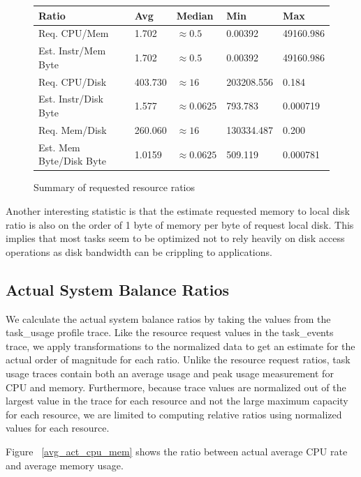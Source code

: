 \documentclass{sig-alternate}
\begin{document}
\begin{figure}
\centering
\begin{tabular}{| p{2cm} | p{1.25cm} | p{1.25cm} | p{1.25cm} | p{1.25cm } |} \hline
Ratio & Avg & Median & Min & Max \\ \hline
Req. CPU/Mem & 1.702 & $\approx 0.5$ & 0.00392 & 49160.986  \\ \hline
Est. Instr/Mem Byte & 1.702 & $\approx 0.5$ & 0.00392 & 49160.986 \\ \hline
Req. CPU/Disk & 403.730 & $\approx 16$ & 203208.556 & 0.184 \\ \hline
Est. Instr/Disk Byte & 1.577 & $\approx 0.0625$ & 793.783 & 0.000719 \\ \hline
Req. Mem/Disk & 260.060 & $\approx 16$ & 130334.487 & 0.200 \\ \hline
Est. Mem Byte/Disk Byte & 1.0159 & $\approx 0.0625$ & 509.119 & 0.000781 \\ \hline
\end{tabular}
\label{request_summary}
\caption{Summary of requested resource ratios}
\end{figure}

Another interesting statistic is that the estimate requested memory to local disk ratio is also on the order of 1 byte of memory per byte of request local disk.
This implies that most tasks seem to be optimized not to rely heavily on disk access operations as disk bandwidth can be crippling to applications.

\subsection{Actual System Balance Ratios}

We calculate the actual system balance ratios by taking the values from the task\_usage profile trace.
Like the resource request values in the task\_events trace, we apply transformations to the normalized data to get an estimate for the actual order of magnitude for each ratio.
Unlike the resource request ratios, task usage traces contain both an average usage and peak usage measurement for CPU and memory.
Furthermore, because trace values are normalized out of the largest value in the trace for each resource and not the large maximum capacity for each resource, we are limited to computing relative ratios using normalized values for each resource.

Figure ~\ref{avg_act_cpu_mem} shows the ratio between actual average CPU rate and average memory usage.
\end{document}
